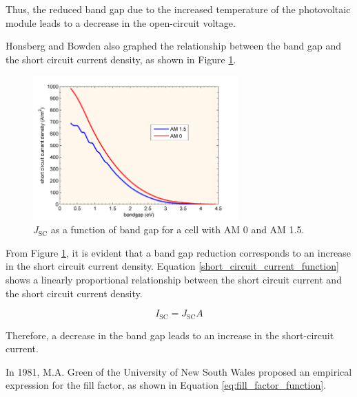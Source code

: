 Thus, the reduced band gap due to the increased temperature of the photovoltaic module leads to a decrease in the open-circuit voltage. \cite{HonsbergOpen-CircuitVoltage}\vspace{0.5em}

\pagebreak
Honsberg and Bowden also graphed the relationship between the band gap and the short circuit current density, as shown in Figure \ref{fig:short_circuit_current_density_bandgap_graph}.

\begin{figure}[ht]
    \centering
    \includegraphics[width=0.7\textwidth]{Figures/short_circuit_current_density_bandgap_graph.png}
    \caption{$J_\text{SC}$ as a function of band gap for a cell with AM 0 and AM 1.5. \cite{HonsbergShort-CircuitCurrent}}
    \label{fig:short_circuit_current_density_bandgap_graph}
\end{figure}
\FloatBarrier

From Figure \ref{fig:short_circuit_current_density_bandgap_graph}, it is evident that a band gap reduction corresponds to an increase in the short circuit current density. Equation \ref{short_circuit_current_function} shows a linearly proportional relationship between the short circuit current and the short circuit current density.

\begin{equation}
    I_\text{SC} = J_\text{SC}A
    \label{short_circuit_current_function}
\end{equation}

Therefore, a decrease in the band gap leads to an increase in the short-circuit current. \cite{HonsbergShort-CircuitCurrent}\vspace{0.5em}

In 1981, M.A. Green of the University of New South Wales proposed an empirical expression for the fill factor, as shown in Equation \ref{eq:fill_factor_function}.

